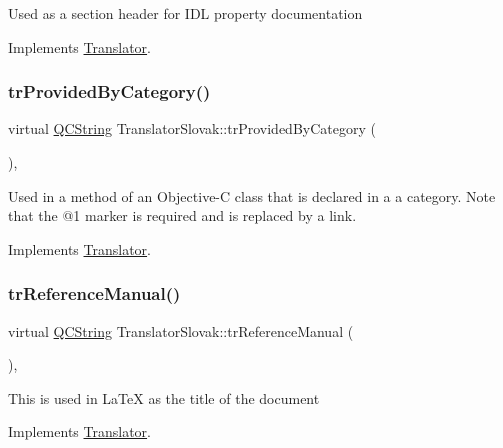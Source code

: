 Used as a section header for I\+DL property documentation 

Implements \mbox{\hyperlink{class_translator}{Translator}}.

\mbox{\label{class_translator_slovak_a299aa4af837122aeaf772ee1216469ad}} 
\subsubsection{\texorpdfstring{trProvidedByCategory()}{trProvidedByCategory()}}
{\footnotesize\ttfamily virtual \mbox{\hyperlink{class_q_c_string}{Q\+C\+String}} Translator\+Slovak\+::tr\+Provided\+By\+Category (\begin{DoxyParamCaption}{ }\end{DoxyParamCaption})\hspace{0.3cm}{\ttfamily [inline]}, {\ttfamily [virtual]}}

Used in a method of an Objective-\/C class that is declared in a a category. Note that the @1 marker is required and is replaced by a link. 

Implements \mbox{\hyperlink{class_translator}{Translator}}.

\mbox{\label{class_translator_slovak_a86d9f066f3013b5564850c73f8c7c8d0}} 
\subsubsection{\texorpdfstring{trReferenceManual()}{trReferenceManual()}}
{\footnotesize\ttfamily virtual \mbox{\hyperlink{class_q_c_string}{Q\+C\+String}} Translator\+Slovak\+::tr\+Reference\+Manual (\begin{DoxyParamCaption}{ }\end{DoxyParamCaption})\hspace{0.3cm}{\ttfamily [inline]}, {\ttfamily [virtual]}}

This is used in La\+TeX as the title of the document 

Implements \mbox{\hyperlink{class_translator}{Translator}}.

\mbox{\label{class_translator_slovak_a9b865266add998fbfeeaf21ca28ba193}} 
